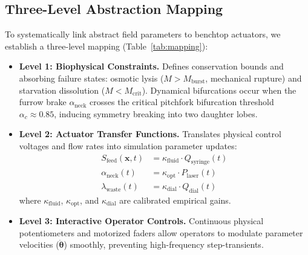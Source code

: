 \documentclass[letterpaper]{article}
\begin{document}
\subsection{Three-Level Abstraction Mapping}

To systematically link abstract field parameters to benchtop actuators, we establish a three-level mapping (Table~\ref{tab:mapping}):
\begin{itemize}
    \item \textbf{Level 1: Biophysical Constraints.} Defines conservation bounds and absorbing failure states: osmotic lysis ($M > M_{\text{burst}}$, mechanical rupture) and starvation dissolution ($M < M_{\text{crit}}$). Dynamical bifurcations occur when the furrow brake $\alpha_{\text{neck}}$ crosses the critical pitchfork bifurcation threshold $\alpha_c \approx 0.85$, inducing symmetry breaking into two daughter lobes.
    \item \textbf{Level 2: Actuator Transfer Functions.} Translates physical control voltages and flow rates into simulation parameter updates:
    \begin{align}
    S_{\text{feed}}(\mathbf{x}, t) &= \kappa_{\text{fluid}} \cdot Q_{\text{syringe}}(t) \\
    \alpha_{\text{neck}}(t) &= \kappa_{\text{opt}} \cdot P_{\text{laser}}(t) \\
    \lambda_{\text{waste}}(t) &= \kappa_{\text{dial}} \cdot Q_{\text{dial}}(t)
    \end{align}
    where $\kappa_{\text{fluid}}$, $\kappa_{\text{opt}}$, and $\kappa_{\text{dial}}$ are calibrated empirical gains.
    \item \textbf{Level 3: Interactive Operator Controls.} Continuous physical potentiometers and motorized faders allow operators to modulate parameter velocities ($\dot{\boldsymbol{\theta}}$) smoothly, preventing high-frequency step-transients.
\end{itemize}
\end{document}
